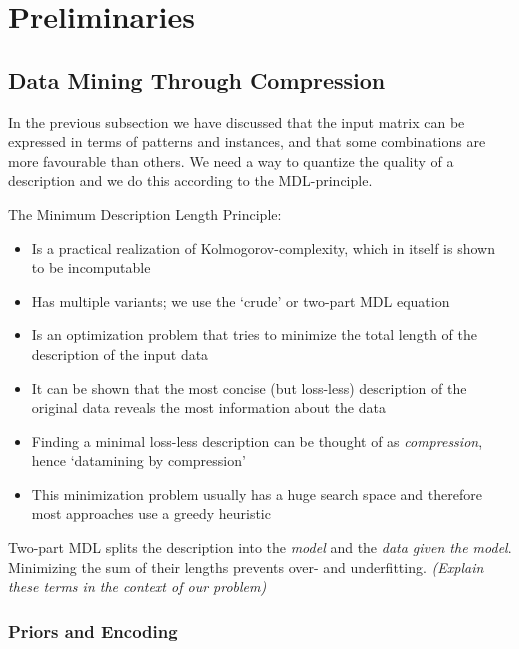 \documentclass{llncs}
\begin{document}
\section{Preliminaries}

\subsection{Data Mining Through Compression}

In the previous subsection we have discussed that the input matrix can be expressed in terms of patterns and instances, and that some combinations are more favourable than others. We need a way to quantize the quality of a description and we do this according to the MDL-principle. 

The Minimum Description Length Principle:
\begin{itemize}
\item Is a practical realization of Kolmogorov-complexity, which in itself is shown to be incomputable
\item Has multiple variants; we use the `crude' or two-part MDL equation
\item Is an optimization problem that tries to minimize the total length of the description of the input data
\item It can be shown that the most concise (but loss-less) description of the original data reveals the most information about the data
\item Finding a minimal loss-less description can be thought of as \emph{compression}, hence `datamining by compression'
\item This minimization problem usually has a huge search space and therefore most approaches use a greedy heuristic
\end{itemize}

Two-part MDL splits the description into the \emph{model} and the \emph{data given the model}. Minimizing the sum of their lengths prevents over- and underfitting. \emph{(Explain these terms in the context of our problem)}

\subsubsection{Priors and Encoding}
\end{document}
